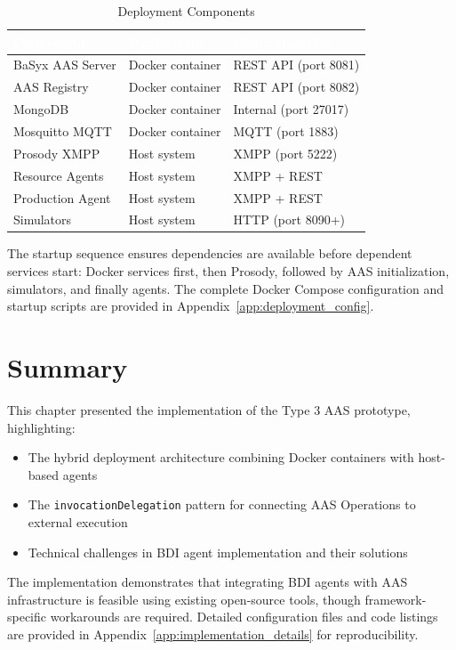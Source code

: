 \begin{table}[ht]
\centering
\caption{Deployment Components}
\label{tab:deployment_components}
\begin{tabular}{lll}
\toprule
\rowcolor{headerblue}
\textcolor{white}{Component} & \textcolor{white}{Deployment} & \textcolor{white}{Communication} \\
\midrule
BaSyx AAS Server & Docker container & REST API (port 8081) \\
AAS Registry & Docker container & REST API (port 8082) \\
MongoDB & Docker container & Internal (port 27017) \\
Mosquitto MQTT & Docker container & MQTT (port 1883) \\
\rowcolor{lightgray}
Prosody XMPP & Host system & XMPP (port 5222) \\
Resource Agents & Host system & XMPP + REST \\
Production Agent & Host system & XMPP + REST \\
Simulators & Host system & HTTP (port 8090+) \\
\bottomrule
\end{tabular}
\end{table}

The startup sequence ensures dependencies are available before dependent services start: Docker services first, then Prosody, followed by \ac{AAS} initialization, simulators, and finally agents. The complete Docker Compose configuration and startup scripts are provided in Appendix~\ref{app:deployment_config}.

\section{Summary}

This chapter presented the implementation of the Type 3 \ac{AAS} prototype, highlighting:
\begin{itemize}
    \item The hybrid deployment architecture combining Docker containers with host-based agents
    \item The \texttt{invocationDelegation} pattern for connecting \ac{AAS} Operations to external execution
    \item Technical challenges in \ac{BDI} agent implementation and their solutions
\end{itemize}

The implementation demonstrates that integrating \ac{BDI} agents with \ac{AAS} infrastructure is feasible using existing open-source tools, though framework-specific workarounds are required. Detailed configuration files and code listings are provided in Appendix~\ref{app:implementation_details} for reproducibility.